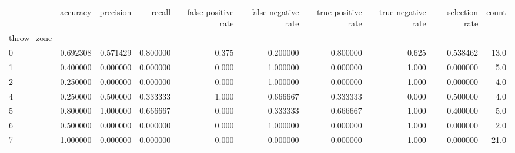 \begin{tabular}{lrrrrrrrrr}
\toprule
{} &  accuracy &  precision &    recall &  false positive rate &  false negative rate &  true positive rate &  true negative rate &  selection rate &  count \\
throw\_zone &           &            &           &                      &                      &                     &                     &                 &        \\
\midrule
0          &  0.692308 &   0.571429 &  0.800000 &                0.375 &             0.200000 &            0.800000 &               0.625 &        0.538462 &   13.0 \\
1          &  0.400000 &   0.000000 &  0.000000 &                0.000 &             1.000000 &            0.000000 &               1.000 &        0.000000 &    5.0 \\
2          &  0.250000 &   0.000000 &  0.000000 &                0.000 &             1.000000 &            0.000000 &               1.000 &        0.000000 &    4.0 \\
4          &  0.250000 &   0.500000 &  0.333333 &                1.000 &             0.666667 &            0.333333 &               0.000 &        0.500000 &    4.0 \\
5          &  0.800000 &   1.000000 &  0.666667 &                0.000 &             0.333333 &            0.666667 &               1.000 &        0.400000 &    5.0 \\
6          &  0.500000 &   0.000000 &  0.000000 &                0.000 &             1.000000 &            0.000000 &               1.000 &        0.000000 &    2.0 \\
7          &  1.000000 &   0.000000 &  0.000000 &                0.000 &             0.000000 &            0.000000 &               1.000 &        0.000000 &   21.0 \\
\bottomrule
\end{tabular}
